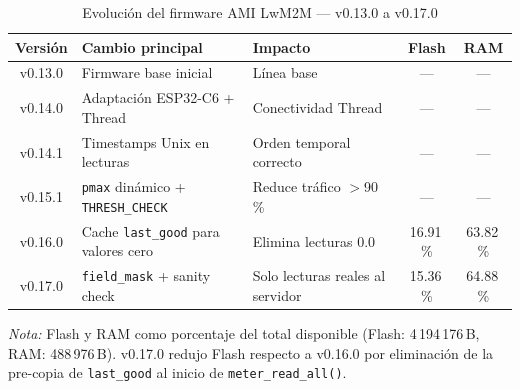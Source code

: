 
\begin{table}[htbp]
\centering
\caption{Evolución del firmware AMI LwM2M — v0.13.0 a v0.17.0}
\label{tab:firmware-evolution-v017}
\small
\begin{tabular}{c l l c c}
\toprule
\textbf{Versión} & \textbf{Cambio principal} & \textbf{Impacto} & \textbf{Flash} & \textbf{RAM} \\
\midrule
v0.13.0 & Firmware base inicial
        & Línea base
        & ---   & --- \\
v0.14.0 & Adaptación ESP32-C6 + Thread
        & Conectividad Thread
        & ---   & --- \\
v0.14.1 & Timestamps Unix en lecturas
        & Orden temporal correcto
        & ---   & --- \\
v0.15.1 & \texttt{pmax} dinámico + \texttt{THRESH\_CHECK}
        & Reduce tráfico $>$90\,\%
        & ---   & --- \\
v0.16.0 & Cache \texttt{last\_good} para valores cero
        & Elimina lecturas 0.0
        & 16.91\,\% & 63.82\,\% \\
v0.17.0 & \texttt{field\_mask} + sanity check
        & Solo lecturas reales al servidor
        & 15.36\,\% & 64.88\,\% \\
\bottomrule
\end{tabular}

\smallskip
\footnotesize
\textit{Nota:} Flash y RAM como porcentaje del total disponible
(Flash: 4\,194\,176\,B, RAM: 488\,976\,B).
v0.17.0 redujo Flash respecto a v0.16.0 por eliminación de la pre-copia
de \texttt{last\_good} al inicio de \texttt{meter\_read\_all()}.
\end{table}
